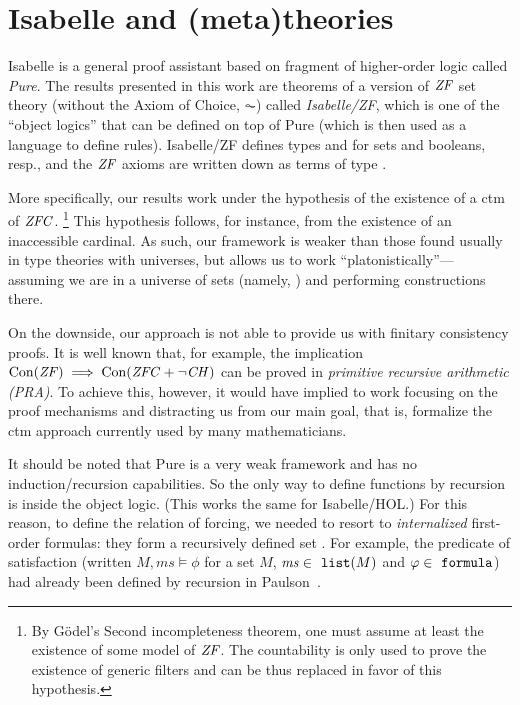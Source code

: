 \section{Isabelle and (meta)theories}
\label{sec:isabelle-metatheories}

Isabelle \cite{Isabelle,DBLP:books/sp/Paulson94} is a general proof
assistant based on fragment of higher-order logic called
\emph{Pure}. 
The results presented in this work are theorems of a
version of $\mathit{ZF}$ set theory (without the Axiom of Choice, $\AC$) 
called \emph{Isabelle/ZF}, which is one of the
``object logics'' that can be defined on top of Pure (which is then
used as a language to define rules). Isabelle/ZF defines types
 and  for sets and booleans, resp., and the $\mathit{ZF}$
axioms are written down as terms of type .

More specifically, our results work under the hypothesis of
the existence of a ctm of $\mathit{ZFC}$.%
\footnote{By Gödel's Second incompleteness theorem, one must assume at
  least the existence of some model of $\mathit{ZF}$. 
  The countability is only used to prove the existence of
  generic filters and can be thus replaced in favor of this
  hypothesis.} 
This hypothesis follows, for instance, from the existence of an
inaccessible cardinal. As such, our framework is weaker than those
found usually in type theories with universes, but allows us to work
``platonistically''--- assuming we are in a universe of sets (namely,
) and performing constructions there.

On the downside, our approach is not able to provide us with finitary
consistency proofs. It is well known that, for example, the
implication $\operatorname{Con}(\mathit{ZF}) \implies \operatorname{Con}(\mathit{ZFC}+\neg\mathit{CH})$ can be proved in
\emph{primitive recursive arithmetic (PRA)}. To achieve this, however,
it would have implied to work focusing on the proof mechanisms
and distracting us from our main goal, that is, formalize the ctm
approach currently used by many mathematicians.

It should be noted that Pure is a very weak framework and has no
induction/recursion capabilities. So the only way to define functions
by recursion is inside the object logic. (This works the same for
Isabelle/HOL.) For this reason, to define the relation of forcing, we
needed to resort to \emph{internalized} first-order formulas: they
form a recursively defined set . For example, the
predicate of satisfaction
(written $M,\mathit{ms}\models\phi$ for a set $M$,
$\mathit{ms}\in\isatt{list}(M)$ and $\phi\in\formula$)
had already been defined by recursion in Paulson~\cite{paulson_2003}.

